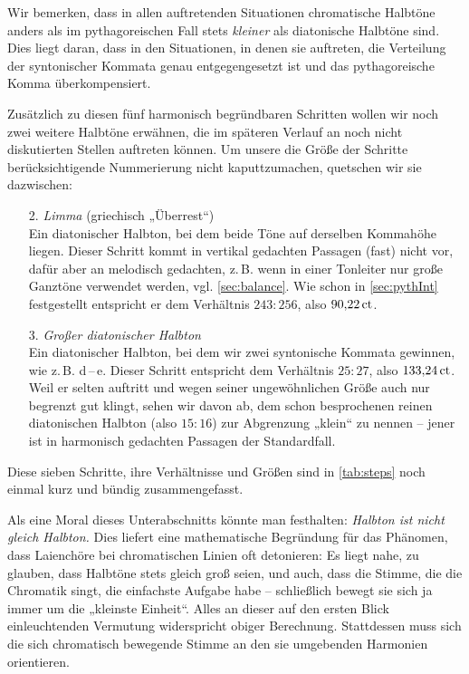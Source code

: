 Wir bemerken, dass in allen auftretenden Situationen chromatische
Halbtöne anders als im pythagoreischen Fall stets \emph{kleiner} als
diatonische Halbtöne sind.  Dies liegt daran, dass in den Situationen,
in denen sie auftreten, die Verteilung der syntonischer Kommata genau
entgegengesetzt ist und das pythagoreische Komma überkompensiert.

Zusätzlich zu diesen fünf harmonisch begründbaren Schritten wollen wir noch zwei
weitere Halbtöne erwähnen, die im späteren Verlauf an noch nicht
diskutierten Stellen auftreten können. Um unsere die Größe der Schritte
berücksichtigende Nummerierung nicht kaputtzumachen, quetschen wir sie dazwischen:

\begin{enumerate}
\item[2\pazofrac12.] \emph{Limma} (griechisch „Überrest“)\\
  Ein diatonischer Halbton, bei dem beide Töne auf derselben Kommahöhe liegen.
  Dieser Schritt kommt in vertikal gedachten Passagen (fast) nicht vor, dafür
  aber an melodisch gedachten, z.\,B. wenn in einer Tonleiter nur große Ganztöne
  verwendet werden, vgl. \cref{sec:balance}. Wie schon in \cref{sec:pythInt}
  festgestellt entspricht er dem Verhältnis $243:256$, also $90{,}22\,\text{ct}$.
\item[3\pazofrac12.] \emph{Großer diatonischer Halbton}\\
  Ein diatonischer Halbton, bei dem wir zwei syntonische Kommata gewinnen, wie
  z.\,B. \naturalm d\,–\,\flatp e. Dieser Schritt entspricht dem Verhältnis
  $25:27$, also $133{,}24\,\text{ct}$. Weil er selten auftritt und wegen seiner
  ungewöhnlichen Größe auch nur begrenzt gut klingt, sehen wir davon ab, dem
  schon besprochenen reinen diatonischen Halbton (also $15:16$) zur Abgrenzung
  „klein“ zu nennen – jener ist in harmonisch gedachten Passagen der
  Standardfall.
\end{enumerate}
  
Diese sieben Schritte, ihre Verhältnisse und Größen sind in \cref{tab:steps}
noch einmal kurz und bündig zusammengefasst.

Als eine Moral dieses Unterabschnitts könnte man festhalten:
\emph{Halbton ist nicht gleich Halbton.}  Dies liefert eine
mathematische Begründung für das Phänomen, dass Laienchöre bei chromatischen
Linien oft detonieren: Es liegt nahe, zu glauben, dass Halbtöne stets
gleich groß seien, und auch, dass die Stimme, die die Chromatik singt, die
einfachste Aufgabe habe – schließlich bewegt sie sich ja immer um die „kleinste
Einheit“. Alles an dieser auf den ersten Blick einleuchtenden Vermutung
widerspricht obiger Berechnung.  Stattdessen muss sich die sich chromatisch
bewegende Stimme an den sie umgebenden Harmonien orientieren.

